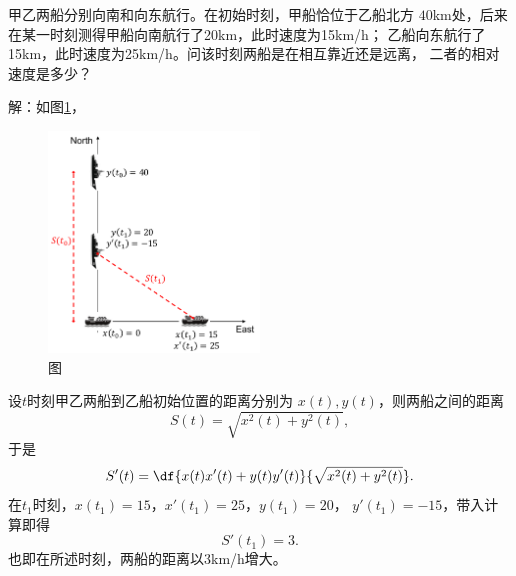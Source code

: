 \bs
{}
\egz 甲乙两船分别向南和向东航行。在初始时刻，甲船恰位于乙船北方
$40$km处，后来在某一时刻测得甲船向南航行了20km，此时速度为15km/h；
乙船向东航行了15km，此时速度为25km/h。问该时刻两船是在相互靠近还是远离，
二者的相对速度是多少？

解：如图\ref{fig:shipDist}，
\begin{figure}[h]
	\centering
	\includegraphics[width=0.5\textwidth]
	{./Images/Ch02/shipDist.pdf}
	\caption{\exNo 图}
	\label{fig:shipDist}
\end{figure}
设$t$时刻甲乙两船到乙船初始位置的距离分别为
$x(t),y(t)$，则两船之间的距离
$$S(t)=\sqrt{x^2(t)+y^2(t)},$$
于是
$$S'(t)=\df{x(t)x'(t)+y(t)y'(t)}{\sqrt{x^2(t)+y^2(t)}}.$$
在$t_1$时刻，$x(t_1)=15$，$x'(t_1)=25$，$y(t_1)=20$，
$y'(t_1)=-15$，带入计算即得
$$S'(t_1)=3.$$
也即在所述时刻，两船的距离以$3$km/h增大。\fin

